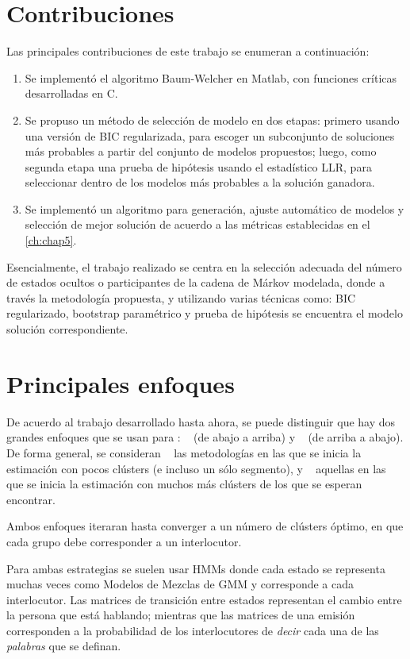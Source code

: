 \section{Contribuciones}

Las principales contribuciones de este trabajo se enumeran a continuación:

\begin{enumerate}
\item Se implementó el algoritmo Baum-Welcher en Matlab, con funciones críticas desarrolladas en C.
\item Se propuso un método de selección de modelo en dos etapas: primero usando una versión de \acf{BIC} regularizada, para escoger un subconjunto de soluciones más probables a partir del conjunto de modelos propuestos; luego, como segunda etapa una prueba de hipótesis usando el estadístico \acf{LLR}, para seleccionar dentro de los modelos más probables a la solución ganadora.
\item Se implementó un algoritmo para generación, ajuste automático de modelos y selección de mejor solución de acuerdo a las métricas establecidas en el \autoref{ch:chap5}.
\end{enumerate}

Esencialmente, el trabajo realizado se centra en la selección adecuada del número de estados ocultos o participantes de la cadena de Márkov modelada, donde a través la metodología propuesta, y utilizando varias técnicas como: \ac{BIC} regularizado, bootstrap paramétrico y prueba de hipótesis se encuentra el modelo solución correspondiente.

\section{Principales enfoques}
\label{sec:previo}

De acuerdo al trabajo desarrollado hasta ahora, se puede distinguir que hay dos grandes enfoques que se usan para \sd: \bu~ (de abajo a arriba) y \td~ (de arriba a abajo). De forma general, se consideran \bu~ las metodologías en las que se inicia la estimación con pocos clústers (e incluso un sólo segmento), y \td~ aquellas en las que se inicia la estimación con muchos más clústers de los que se esperan encontrar.

Ambos enfoques iteraran hasta converger a un número de clústers óptimo, en que cada grupo debe corresponder a un interlocutor.

Para ambas estrategias se suelen usar \acp{HMM} donde cada estado se representa muchas veces como Modelos de Mezclas de \ac{GMM} y corresponde a cada interlocutor. Las matrices de transición entre estados representan el cambio entre la persona que está hablando; mientras que las matrices de una emisión corresponden a la probabilidad de los interlocutores de \textit{decir} cada una de las \textit{palabras} que se definan.

